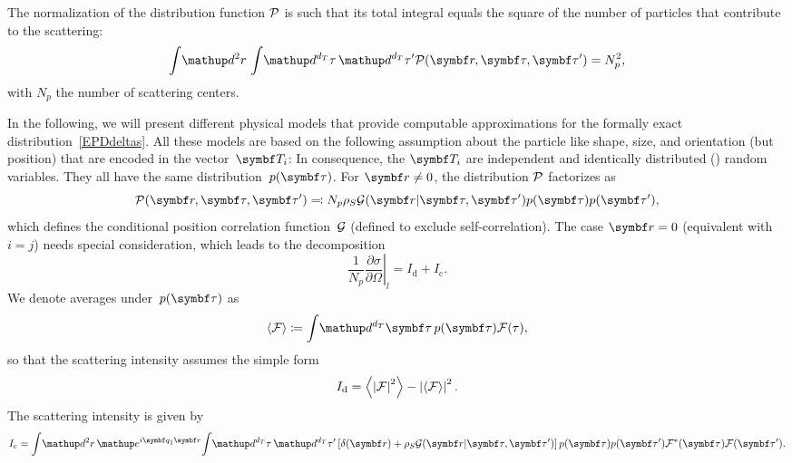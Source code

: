 The normalization of the distribution function $\mathcal{P}$ is such that its total
integral equals the square of the number of particles that contribute to the scattering:
\begin{equation}
  \int\!\d^2r\, \int\! \d^{d_T}\tau\, \d^{d_T}\tau' \PD(\r,\v\tau,\v\tau')
  = N_p^2,
\end{equation}
with $N_p$ the number of scattering centers.


In the following, we will present different physical models
that provide computable approximations
for the formally exact distribution~\cref{EPDdeltas}.
All these models are based on the following assumption
about the particle  like shape, size, and orientation
(but  position) that are  encoded in the vector~$\v T_i$:
%
In consequence, the $\v T_i$
are independent and identically distributed () random variables.
They all have the same distribution~$p(\v\tau)$.
For $\r\ne0$, the distribution $\mathcal{P}$ factorizes as
\begin{equation}
  \PD(\r,\v\tau,\v\tau')\eqqcolon N_p \rho_S \GD(\r|\v\tau,\v\tau')p(\v\tau)p(\v\tau'),
\end{equation}
which defines the conditional position correlation function~$\mathcal{G}$ (defined to exclude self-correlation).
The case $\r=0$ (equivalent with $i=j$) needs special consideration,
which leads to the decomposition
\Emph
{\begin{equation}
  \frac{1}{N_p}\left.\frac{\partial\sigma}{\partial\Omega}\right|_l
  = I_\text{d}+I_\text{c}.
\end{equation}\vskip -5pt}
We denote averages under~$p(\v\tau)$ as
\begin{equation}
  \bra\FD\ket \coloneqq  \int\!\d^{d_T}\v\tau\,p(\v\tau)\FD(\tau),
\end{equation}
so that the  scattering intensity assumes the simple form
%
%
\Emph
{\begin{equation}
  I_\text{d} = \left\langle\left|\mathcal{F}\right|^2\right\rangle-\left|\left\langle\mathcal{F}\right\rangle\right|^2.
\end{equation}\vskip -5pt}
The  scattering intensity is given by
\Emph
{\begin{equation}\label{EICoherent}
  I_\text{c} =
  \int\!\d^2r\,   \e^{i\q_{\plll}\r}\!
  \int\! \d^{d_T}\tau\, \d^{d_T}\tau'
  \left[\delta(\r)+\rho_S \GD(\r|\v\tau,\v\tau')\right]p(\v\tau)p(\v\tau')
    \FD^*(\v\tau) \FD(\v\tau').
\end{equation}\vskip -5pt}

